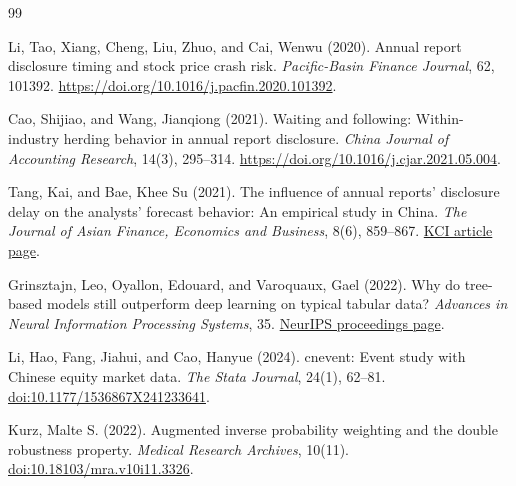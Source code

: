 \documentclass[10pt]{article}
\begin{document}
\smallskip
\scriptsize
\setlength{\itemsep}{0pt}
\setlength{\parskip}{0pt}
\begin{thebibliography}{99}

Li, Tao, Xiang, Cheng, Liu, Zhuo, and Cai, Wenwu (2020). Annual report disclosure timing and stock price crash risk. \emph{Pacific-Basin Finance Journal}, 62, 101392.
\href{https://doi.org/10.1016/j.pacfin.2020.101392}{https://doi.org/10.1016/j.pacfin.2020.101392}.

Cao, Shijiao, and Wang, Jianqiong (2021). Waiting and following: Within-industry herding behavior in annual report disclosure. \emph{China Journal of Accounting Research}, 14(3), 295--314.
\href{https://doi.org/10.1016/j.cjar.2021.05.004}{https://doi.org/10.1016/j.cjar.2021.05.004}.

Tang, Kai, and Bae, Khee Su (2021). The influence of annual reports' disclosure delay on the analysts' forecast behavior: An empirical study in China. \emph{The Journal of Asian Finance, Economics and Business}, 8(6), 859--867.
\href{https://www.kci.go.kr/kciportal/ci/sereArticleSearch/ciSereArtiView.kci?sereArticleSearchBean.artiId=ART002723651}{KCI article page}.

Grinsztajn, Leo, Oyallon, Edouard, and Varoquaux, Gael (2022). Why do tree-based models still outperform deep learning on typical tabular data? \emph{Advances in Neural Information Processing Systems}, 35.
\href{https://proceedings.neurips.cc/paper_files/paper/2022/hash/0378c7692da36807bdec87ab043cdadc-Abstract-Datasets_and_Benchmarks.html}{NeurIPS proceedings page}.

Li, Hao, Fang, Jiahui, and Cao, Hanyue (2024). cnevent: Event study with Chinese equity market data. \emph{The Stata Journal}, 24(1), 62--81.
\href{https://doi.org/10.1177/1536867X241233641}{doi:10.1177/1536867X241233641}.

Kurz, Malte S. (2022). Augmented inverse probability weighting and the double robustness property. \emph{Medical Research Archives}, 10(11).
\href{https://doi.org/10.18103/mra.v10i11.3326}{doi:10.18103/mra.v10i11.3326}.

\end{thebibliography}
\end{document}
